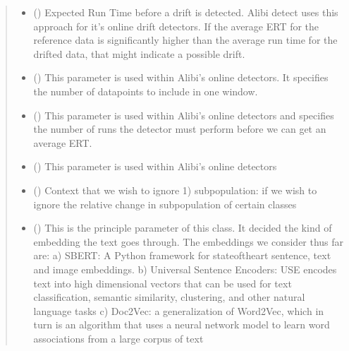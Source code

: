 \documentclass[letterpaper,10pt,english]{sphinxmanual}
\begin{document}
\begin{fulllineitems}
\begin{fulllineitems}
\begin{quote}
\begin{description}
\begin{itemize}
\item {} 
\sphinxAtStartPar
{} (\sphinxstyleliteralemphasis{\sphinxupquote{ (}}\sphinxstyleliteralemphasis{\sphinxupquote{)}}) \textendash{} Expected Run Time before a drift is detected. Alibi detect uses this approach for it’s
online drift detectors. If the average ERT for the reference data is significantly higher
than the average run time for the drifted data, that might indicate a possible drift.

\item {} 
\sphinxAtStartPar
{} () \textendash{} This parameter is used within Alibi’s online detectors.
It specifies the number of datapoints to include in one window.

\item {} 
\sphinxAtStartPar
{} () \textendash{} This parameter is used within Alibi’s online detectors and specifies the number of runs
the detector must perform before we can get an average ERT.

\item {} 
\sphinxAtStartPar
{} () \textendash{} This parameter is used within Alibi’s online detectors

\item {} 
\sphinxAtStartPar
{} () \textendash{} Context that we wish to ignore
1) sub\sphinxhyphen{}population: if we wish to ignore the relative change in sub\sphinxhyphen{}population of certain
classes

\item {} 
\sphinxAtStartPar
{} () \textendash{} This is the principle parameter of this class. It decided the kind of embedding the text
goes through. The embeddings we consider thus far are:
a) SBERT: A Python framework for state\sphinxhyphen{}of\sphinxhyphen{}the\sphinxhyphen{}art sentence, text and image embeddings.
b) Universal Sentence Encoders: USE encodes text into high dimensional vectors that can be
used for text classification, semantic similarity, clustering, and other natural language tasks
c) Doc2Vec: a generalization of Word2Vec, which in turn is an algorithm that uses a
neural network model to learn word associations from a large corpus of text


\end{itemize}
\end{description}
\end{quote}
\end{fulllineitems}
\end{fulllineitems}
\end{document}
